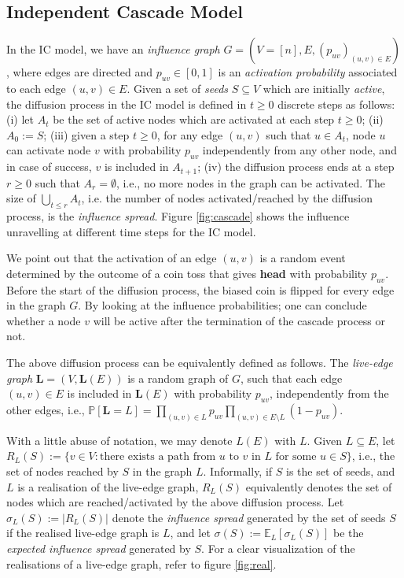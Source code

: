 \subsection{Independent Cascade Model}

In the IC model, we have an {\em influence graph}  $G=(V=[n],E,(p_{uv})_{(u,v)\in E})$, where edges are directed and $p_{uv}\in [0,1]$ is an {\em activation probability} associated to each edge $(u,v)\in E$. Given a set of {\em seeds} $S\subseteq V$ which are initially \emph{active}, the diffusion process in the IC model is defined in $t\geq 0$  discrete steps as follows: (i) let $A_t$ be the set of active nodes which are activated at each step $t\geq 0$; (ii) $A_0:=S$; (iii) given a step $t\geq 0$, for any edge $(u,v)$ such that $u\in A_t$, node $u$ can activate node $v$ with probability $p_{uv}$ independently from any other node, and in case of success, $v$ is included in $A_{t+1}$; (iv) the diffusion process ends at a step $r\geq 0$ such that $A_{r}=\emptyset$, i.e., no more nodes in the graph can be activated. The size of $\bigcup_{t\leq r} {A_t}$, i.e. the number of nodes activated/reached by the diffusion process, is the {\em influence spread}. Figure \ref{fig:cascade} shows the influence unravelling at different time steps for the IC model.

We point out that the activation of an edge $(u,v)$ is a random event determined by the outcome of a coin toss that gives \textbf{head} with probability $p_{uv}$. Before the start of the diffusion process, the biased coin is flipped for every edge in the graph $G$. By looking at the influence probabilities; one can conclude whether a node $v$ will be active after the termination of the cascade process or not.

The above diffusion process can be equivalently defined as follows. The {\em live-edge graph} $\bm L=(V,\bm L(E))$ is a random graph of $G$, such that each edge $(u,v)\in E$ is included in $\bm L(E)$ with probability $p_{uv}$, independently from the other edges, i.e., $\mathbb{P}[\bm L=L]=\prod_{(u,v)\in L}p_{uv}\prod_{(u,v)\in E\setminus L}(1-p_{uv})$. 

With a little abuse of notation, we may denote $L(E)$ with $L$. Given $L\subseteq E$, let $R_L(S):=\{v\in V:\text{there exists a path from $u$ to $v$ in $L$ for some $u\in S$}\}$, i.e., the set of nodes reached by $S$ in the graph $L$. Informally, if $S$ is the set of seeds, and $L$ is a realisation of the live-edge graph, $R_L(S)$ equivalently denotes the set of nodes which are reached/activated by the above diffusion process. Let $\sigma_L(S):=|R_L(S)|$ denote the {\em influence spread} generated by the set of seeds $S$ if the realised live-edge graph is $L$, and let $\sigma(S):=\mathbb{E}_{ L}[\sigma_{{L}}(S)]$ be the {\em expected influence spread} generated by $S$. For a clear visualization of the realisations of a live-edge graph, refer to figure \ref{fig:real}.

